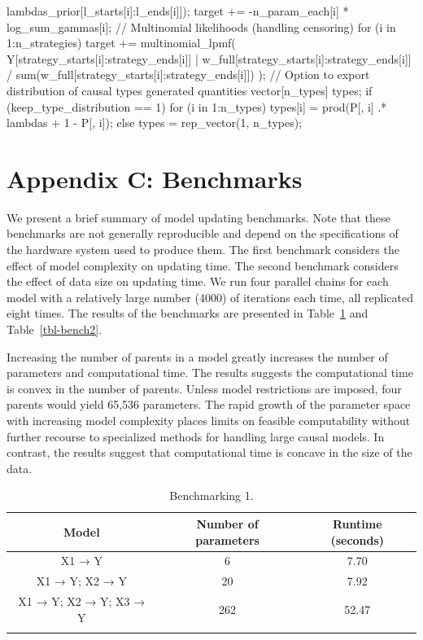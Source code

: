 \documentclass[
  11pt,
  article]{jss}
\begin{document}
\begin{CodeChunk}
\begin{CodeOutput}
{{                             lambdas_prior[l_starts[i]:l_ends[i]]);
    target += -n_param_each[i] * log_sum_gammas[i];
  }
  // Multinomial likelihoods (handling censoring)
  for (i in 1:n_strategies) {
    target += multinomial_lpmf(
      Y[strategy_starts[i]:strategy_ends[i]] |
      w_full[strategy_starts[i]:strategy_ends[i]] /
      sum(w_full[strategy_starts[i]:strategy_ends[i]])
    );
  }
}
// Option to export distribution of causal types
generated quantities {
  vector[n_types] types;
  if (keep_type_distribution == 1) {
    for (i in 1:n_types) {
      types[i] = prod(P[, i] .* lambdas + 1 - P[, i]);
    }
  } else {
    types = rep_vector(1, n_types);
  }
} 
\end{CodeOutput}
\end{CodeChunk}

\newpage{}

\section*{Appendix C: Benchmarks}\label{sec-benchmark}

We present a brief summary of model updating benchmarks. Note that these
benchmarks are not generally reproducible and depend on the
specifications of the hardware system used to produce them. The first
benchmark considers the effect of model complexity on updating time. The
second benchmark considers the effect of data size on updating time. We
run four parallel chains for each model with a relatively large number
(4000) of iterations each time, all replicated eight times. The results
of the benchmarks are presented in Table~\ref{tbl-bench1} and
Table~\ref{tbl-bench2}.

Increasing the number of parents in a model greatly increases the number
of parameters and computational time. The results suggests the
computational time is convex in the number of parents. Unless model
restrictions are imposed, four parents would yield 65,536 parameters.
The rapid growth of the parameter space with increasing model complexity
places limits on feasible computability without further recourse to
specialized methods for handling large causal models. In contrast, the
results suggest that computational time is concave in the size of the
data.

\begin{longtable}{ccc}

\toprule
Model & Number of parameters & Runtime (seconds)\\
\midrule
X1 → Y & 6 & 7.70\\
X1 → Y; X2 → Y & 20 & 7.92\\
X1 → Y; X2 → Y; X3 → Y & 262 & 52.47\\
\bottomrule


\caption{\label{tbl-bench1}Benchmarking 1.}

\tabularnewline
\end{longtable}
\end{document}

